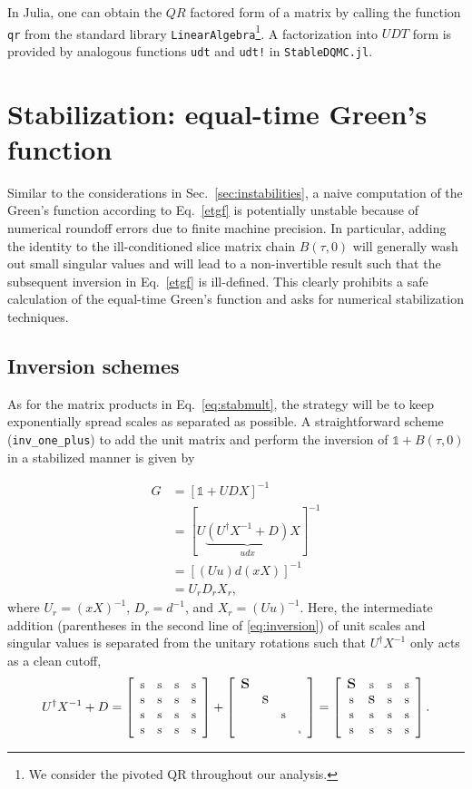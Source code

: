 \documentclass[submission, Phys]{SciPost}
\newcommand{\stiny}{\scalebox{0.5}{s}}
\newcommand{\ssmall}{\scalebox{0.9}{s}}
\newcommand{\smedium}{\scalebox{1.3}{s}}
\newcommand{\slarge}{\scalebox{1.7}{s}}
\newcommand{\U}{\left[
	\begin{array}{cccc}
		\ssmall & \ssmall & \ssmall & \ssmall \\
		\ssmall & \ssmall & \ssmall & \ssmall \\
		\ssmall & \ssmall & \ssmall & \ssmall \\
		\ssmall & \ssmall & \ssmall & \ssmall \\
	\end{array}
	\right]}
\newcommand{\D}{\left[
	\begin{array}{cccc}
		\slarge &  &  &  \\
		& \smedium &  &  \\
		&  & \ssmall &  \\
		&  &  & \stiny \\
	\end{array}
	\right]}
\begin{document}
In Julia, one can obtain the $QR$ factored form of a matrix by calling the function \texttt{qr} from the standard library \texttt{LinearAlgebra}\footnote{We consider the pivoted QR throughout our analysis.}. A factorization into $UDT$ form is provided by analogous functions \texttt{udt} and \texttt{udt!} in \texttt{StableDQMC.jl}.

\section{Stabilization: equal-time Green's function} \label{sec:etgf}

Similar to the considerations in Sec.~\ref{sec:instabilities}, a naive computation of the Green's function according to Eq.~\eqref{etgf} is potentially unstable because of numerical roundoff errors due to finite machine precision. In particular, adding the identity to the ill-conditioned slice matrix chain $B(\tau, 0)$ will generally wash out small singular values and will lead to a non-invertible result such that the subsequent inversion in Eq.~\eqref{etgf} is ill-defined. This clearly prohibits a safe calculation of the equal-time Green’s function and asks for numerical stabilization techniques.

\subsection{Inversion schemes}
As for the matrix products in Eq.~\eqref{eq:stabmult}, the strategy will be to keep exponentially spread scales as separated as possible. A straightforward scheme \cite{Santos2003, Assaad2002a} (\texttt{inv\_one\_plus}) to add the unit matrix and perform the inversion of $\mathbb{1} + B(\tau, 0)$ in a stabilized manner is given by

\begin{align}
	G &= [\mathbb{1} + UDX]^{-1} \nonumber \\
	&= [U\underbrace{(U^\dagger X^{-1} + D)}_{udx}X]^{-1} \nonumber\\
	&= [(Uu)d(xX)]^{-1} \label{eq:inversion}\\
	&= U_r D_r X_r \nonumber,
\end{align}
where $U_r = (xX)^{-1}$, $D_r = d^{-1}$, and $X_r = (Uu)^{-1}$. Here, the intermediate addition (parentheses in the second line of \eqref{eq:inversion}) of unit scales and singular values is separated from the unitary rotations such that $U^\dagger X^{-1}$ only acts as a clean cutoff,
\begin{align}
U^\dagger X^{-1} + D = \U + \D = \left[
\begin{array}{cccc}
\slarge & \ssmall & \ssmall & \ssmall \\
\ssmall & \smedium & \ssmall & \ssmall \\
\ssmall & \ssmall & \ssmall & \ssmall \\
\ssmall & \ssmall & \ssmall & \ssmall \\
\end{array}
\right].
\end{align}
\end{document}
